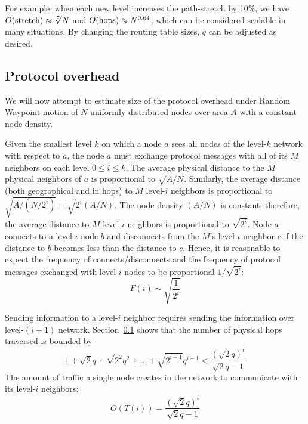\documentclass[conference]{IEEEtran}
\theoremstyle{definition}
\begin{document}
For example, when each new level increases the path-stretch by 10\%, we have $O({\rm stretch}) \approx \sqrt[7]{N}$ and $O({\rm hops}) \approx N^{0.64}$, which can be considered scalable in many situations. By changing the routing table sizes, $q$ can be adjusted as desired.


\subsection{Protocol overhead}
\label{sec:analysis:overhead}

We will now attempt to estimate size of the protocol overhead under Random Waypoint motion of $N$ uniformly distributed nodes over area $A$ with a constant node density.

Given the smallest level $k$ on which a node $a$ sees all nodes of the level-$k$ network with respect to $a$, the node $a$ must exchange protocol messages with all of its $M$ neighbors on each level $0 \le i \le k$. The average physical distance to the $M$ physical neighbors of $a$ is proportional to $\sqrt{A / N}$. Similarly, the average distance (both geographical and in hops) to $M$ level-$i$ neighbors is proportional to $\sqrt{A / (N / 2^i)} = \sqrt{2^i (A / N)}$. The node density $(A / N)$ is constant; therefore, the average distance to $M$ level-$i$ neighbors is proportional to $\sqrt{2^i}$. Node $a$ connects to a level-$i$ node $b$ and disconnects from the $M$'s level-$i$ neighbor $c$ if the distance to $b$ becomes less than the distance to $c$. Hence, it is reasonable to expect the frequency of connects/disconnects and the frequency of protocol messages exchanged with level-$i$ nodes to be proportional $1 / \sqrt{2^i}$:
%
\begin{equation*}
    F(i) \sim \sqrt{\frac{1}{2^i}}
\end{equation*}

Sending information to a level-$i$ neighbor requires sending the information over level-$(i - 1)$ network. Section~\ref{sec:analysis:overhead} shows that the number of physical hops traversed is bounded by 
%
\begin{equation*}
    1 + \sqrt{2} q + \sqrt{2^2} q^2  + ... + \sqrt{2^{i-1}} q^{i-1} < \frac{ (\sqrt{2}q)^i }{\sqrt{2}q - 1}
\end{equation*}
%
The amount of traffic a single node creates in the network to communicate with its level-$i$ neighbors:
%
\begin{equation*}
    O(T(i)) = \frac{ (\sqrt{2}q)^i }{\sqrt{2}q - 1}
\end{equation*}
\end{document}

